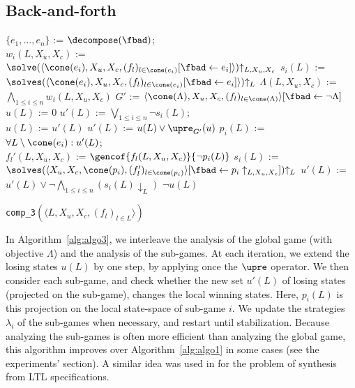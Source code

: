 \documentclass[submission,copyright,creativecommons]{eptcs}
\begin{document}
\subsection{Back-and-forth}
\begin{algorithm}
\small
	$\{e_1,\ldots,e_n\}$ := $\decompose(\fbad)$;
	\\
	{
		$w_i(L,X_u,X_c)$ := $\solve(\langle 
		\cone(e_i), X_u, X_c, (f_l)_{l \in \cone(e_i)}[\fbad \leftarrow
		e_i] \rangle){\uparrow_{L,X_u,X_c}}$\;
		$s_i(L)$ := $\solves(\langle 
		\cone(e_i), X_u, X_c, (f_l)_{l \in \cone(e_i)}[\fbad \leftarrow
		e_i] \rangle){\uparrow_{L}}$\;
                \label{alg3-loc:endofloop}
	}
	$\Lambda(L, X_u, X_c)$ := $\bigwedge_{1 \le i \le n}
	w_i(L, X_u, X_c)$\;
	$G'$ := $\langle \cone(\Lambda), X_u, X_c, (f_l)_{l \in
	\cone(\Lambda)}\rangle[\fbad \leftarrow \lnot \Lambda ]$\;
	$u(L)$ := $0$\;
	$u'(L)$ := $\bigvee_{1 \le i \le n} \lnot s_i(L)$;
	\\
	{
		$u(L)$ := $u'(L)$\;
		$u'(L)$ := $u(L) \lor \upre_{G'}(u)$\;
	  \label{line:upre}
		{
			$p_i(L)$ := $\forall L \setminus \cone(e_i) :
			u'(L)$;
			\\
			{
				{
					$f_l'(L,X_u,X_c)$ := $\gencof{f_l(L,X_u,X_c)}{
					\lnot p_i(L)}$
				}
				$s_i(L)$ := $\solves(\langle X_u, X_c,
					\cone(p_i), (f'_l)_{l \in
					\cone(p_i)}\rangle[\fbad \leftarrow
					p_i\uparrow_{L,X_u,X_c}]){\uparrow_{L}}$\;
			}
		}
		$u'(L)$ := $u'(L) \lor \lnot \bigwedge_{1 \le i \le n} (s_i(L)
		\downarrow_L)$\;
	}
	\Return $\lnot u(L)$\;
\caption{\texttt{comp\_3}$(\langle L, X_u, X_c, (f_l)_{l\in L}\rangle)$}
\label{alg:algo3}
\end{algorithm}

In Algorithm~\ref{alg:algo3}, we interleave the analysis of the global game
(with objective $\Lambda$) and the analysis of the sub-games. At each iteration,
we extend the losing states $u(L)$ by one step, by applying once the $\upre$
operator.  We then consider each sub-game, and check whether the new set $u'(L)$
of losing states (projected on the sub-game), changes the local winning states.
Here, $p_i(L)$ is this projection on the local state-space of sub-game $i$.  We
update the strategies~$\lambda_i$ of the sub-games when necessary, and restart
until stabilization.  Because analyzing the sub-games is often more efficient
than analyzing the global game, this algorithm improves over
Algorithm~\ref{alg:algo1} in some cases (see the experiments' section).  A
similar idea was used in \cite{FiliotJR11} for the problem of synthesis from LTL
specifications.
\end{document}
